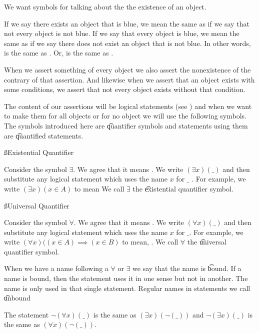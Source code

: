 

We want symbols for talking about the the existence of an object.


If we say there exists an object that is blue, we mean the same as if we say that not every object is not blue.
If we say that every object is blue, we mean the same as if we say there does not exist an object that is not blue.
In other words,  is the same as .
Or,  is the same as .

When we assert something of every object we also assert the nonexistence of the contrary of that assertion.
And likewise when we assert that an object exists with some conditions, we assert that not every object exists without that condition.

The content of our assertions will be logical statements (see ) and when we want to make them for all objects or for no object we will use the following symbols.
The symbols introduced here are \t{quantifier symbols} and statements using them are \t{quantified statements}.

\ss{Existential Quantifier}

Consider the symbol $\exists$.
We agree that it means .
We write $(\exists x)(\_)$ and then substitute any logical statement which uses the name $x$ for $\_$ .
For example, we write $(\exists x)(x \in A)$ to mean 
We call $\exists$ the \t{existential quantifier} symbol.

\ss{Universal Quantifier}

Consider the symbol $\forall$.
We agree that it means .
We write $(\forall x)(\_)$ and then substitute any logical statement which uses the name $x$ for $\_$.
For example, we write $(\forall x)((x \in A)\implies(x \in B)$ to mean, .
We call $\forall$ the \t{universal quantifier} symbol.


When we have a name following a $\forall$ or $\exists$ we say that the name is \t{bound}.
If a name is bound, then the statement uses it in one sense but not in another.
The name is only used in that single statement.
Regular names in statements we call \t{unbound}


The statement $\neg(\forall x)(\_)$ is the same as $(\exists x)(\neg(\_))$ and $\neg(\exists x)(\_)$ is the same as $(\forall x)(\neg(\_))$.